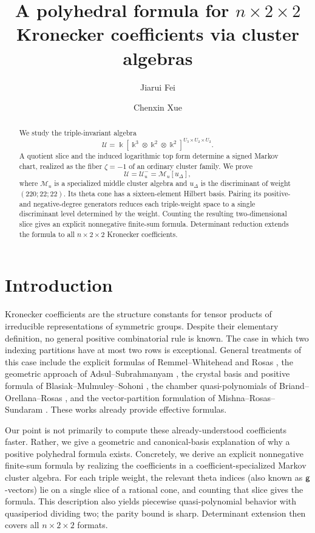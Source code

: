 \documentclass[11pt,reqno]{amsart}
\title{A polyhedral formula for $n\times2\times2$ Kronecker coefficients via cluster algebras}
\author{Jiarui Fei}
\author{Chenxin Xue}
\date{}
\numberwithin{equation}{section}
\theoremstyle{remark}
\newcommand{\kk}{\Bbbk}
\newcommand{\UR}{\mathscr U}
\newcommand{\Uneg}{\mathcal U_u^{-}}
\newcommand{\Mu}{\mathcal M_u}
\newcommand{\udisc}{u_{\Delta}}
\newcommand{\g}{{\sf g}}
\begin{document}
\begin{abstract}
We study the triple-invariant algebra
\[ \UR=\kk[\kk^3\otimes\kk^2\otimes\kk^2]^{U_3\times U_2\times U_2}. \]
A quotient slice and the induced logarithmic top form determine a signed
Markov chart, realized as the fiber $\zeta=-1$ of an ordinary cluster
family.  We prove
\[ \UR=\Uneg=\Mu[\udisc], \]
where $\Mu$ is a specialized middle cluster algebra and $\udisc$ is the
discriminant of weight $(220;22;22)$.  Its theta cone has a sixteen-element
Hilbert basis.  Pairing its positive- and negative-degree generators reduces each
triple-weight space to a single discriminant level determined by the weight.
Counting the resulting two-dimensional slice gives an explicit nonnegative finite-sum formula.
Determinant reduction extends the formula to all $n\times2\times2$
Kronecker coefficients.
\end{abstract}

\maketitle

\section*{Introduction}

Kronecker coefficients are the structure constants for tensor products of
irreducible representations of symmetric groups.  Despite their elementary
definition, no general positive combinatorial rule is known.  The case in
which two indexing partitions have at most two rows is exceptional.  General
treatments of this case include the explicit formulas of
Remmel--Whitehead and Rosas \cite{RW,Rosas}, the geometric approach of
Adsul--Subrahmanyam \cite{AS}, the crystal basis and positive formula of
Blasiak--Mulmuley--Sohoni \cite{BMS}, the chamber quasi-polynomials of
Briand--Orellana--Rosas \cite{BOR09}, and the vector-partition formulation of
Mishna--Rosas--Sundaram \cite{MRS}.  These works already provide effective
formulas.

Our point is not primarily to compute these already-understood
coefficients faster.  Rather, we give a geometric and canonical-basis
explanation of why a positive polyhedral formula exists.  Concretely, we
derive an explicit nonnegative finite-sum formula by realizing the coefficients in a
coefficient-specialized Markov cluster algebra.  For each triple weight, the
relevant theta indices (also known as $\g$-vectors) lie on a single slice of a
rational cone, and counting that slice gives the formula.  This description
also yields piecewise quasi-polynomial behavior with quasiperiod dividing
two; the parity bound is sharp.  Determinant extension then covers all
$n\times2\times2$ formats.
\end{document}
